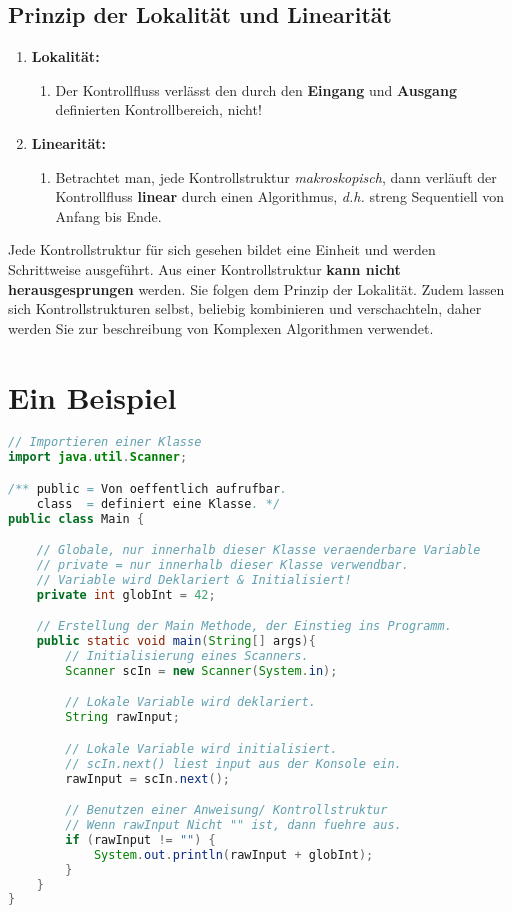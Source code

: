 \documentclass[12pt, a4paper]{article}
\begin{document}
\subsection*{Prinzip der Lokalität und Linearität}
\begin{enumerate}
    \item \textbf{Lokalität:}
    \begin{enumerate}
        \item Der Kontrollfluss verlässt den durch den \textbf{Eingang} und \textbf{Ausgang} definierten Kontrollbereich, nicht!
    \end{enumerate}
    \item \textbf{Linearität:}
    \begin{enumerate}
        \item Betrachtet man, jede Kontrollstruktur \textit{makroskopisch}, dann verläuft der Kontrollfluss \textbf{linear} durch einen Algorithmus, \textit{d.h.} streng Sequentiell von Anfang bis Ende.
    \end{enumerate}
\end{enumerate}
Jede Kontrollstruktur für sich gesehen bildet eine Einheit und werden Schrittweise ausgeführt. Aus einer Kontrollstruktur \textbf{kann nicht herausgesprungen} werden. Sie folgen dem Prinzip der Lokalität. Zudem lassen sich Kontrollstrukturen selbst, beliebig kombinieren und verschachteln, daher werden Sie zur beschreibung von Komplexen Algorithmen verwendet.
\newpage
\section*{Ein Beispiel}
\begin{lstlisting}[language=java,title=Beispiel]
// Importieren einer Klasse
import java.util.Scanner;

/** public = Von oeffentlich aufrufbar. 
    class  = definiert eine Klasse. */
public class Main {

    // Globale, nur innerhalb dieser Klasse veraenderbare Variable
    // private = nur innerhalb dieser Klasse verwendbar.
    // Variable wird Deklariert & Initialisiert!
    private int globInt = 42;

    // Erstellung der Main Methode, der Einstieg ins Programm.
    public static void main(String[] args){
        // Initialisierung eines Scanners.
        Scanner scIn = new Scanner(System.in);

        // Lokale Variable wird deklariert.
        String rawInput;

        // Lokale Variable wird initialisiert.
        // scIn.next() liest input aus der Konsole ein.
        rawInput = scIn.next();

        // Benutzen einer Anweisung/ Kontrollstruktur
        // Wenn rawInput Nicht "" ist, dann fuehre aus.
        if (rawInput != "") {
            System.out.println(rawInput + globInt);
        }
    }
}
\end{lstlisting}
\end{document}
